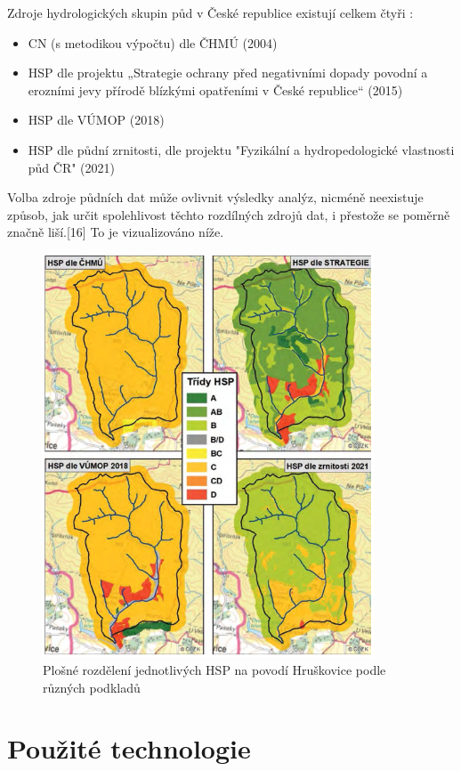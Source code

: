 \documentclass[a4paper,oneside,12pt]{book}
\begin{document}
Zdroje hydrologických skupin půd v České republice existují celkem čtyři \cite{Strouhal2022}:
\begin{itemize}
\item CN (s metodikou výpočtu) dle ČHMÚ (2004)
\item HSP dle projektu „Strategie ochrany před negativními dopady povodní a erozními jevy přírodě blízkými opatřeními v České republice“ (2015)
\item HSP dle VÚMOP (2018) 
\item HSP dle půdní zrnitosti, dle projektu "Fyzikální a hydropedologické vlastnosti půd ČR" (2021)
\end{itemize}
\hspace{10mm} Volba zdroje půdních dat může ovlivnit výsledky analýz, nicméně neexistuje způsob, jak určit spolehlivost těchto rozdílných zdrojů dat, i přestože se poměrně značně liší.[16] To je vizualizováno níže.

\begin{figure}[ht] \label{obr4}
\centering
\includegraphics[height=12cm]{pictures/HSPmapa.png}
\caption{Plošné rozdělení jednotlivých HSP na povodí Hruškovice podle různých podkladů \cite{Strouhal2022}}
\label{fig:hsp}
\end{figure}

\newpage
\newpage

\chapter{Použité technologie} \label{tehcnologie}
\end{document}
